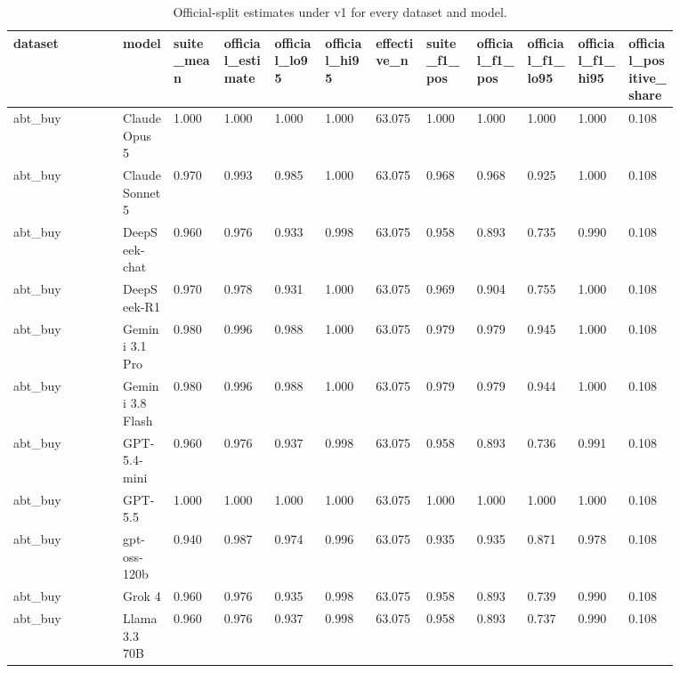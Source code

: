 \begin{landscape}
\tiny
\setlength{\tabcolsep}{3pt}
\begin{longtable}{p{0.134\linewidth}p{0.067\linewidth}p{0.067\linewidth}p{0.067\linewidth}p{0.067\linewidth}p{0.067\linewidth}p{0.067\linewidth}p{0.067\linewidth}p{0.067\linewidth}p{0.067\linewidth}p{0.067\linewidth}p{0.067\linewidth}}
\caption{Official-split estimates under v1 for every dataset and model.}\label{tab:official_split_v1}\\
\toprule
dataset & model & suite\_\allowbreak{}mean & official\_\allowbreak{}estimate & official\_\allowbreak{}lo95 & official\_\allowbreak{}hi95 & effective\_\allowbreak{}n & suite\_\allowbreak{}f1\_\allowbreak{}pos & official\_\allowbreak{}f1\_\allowbreak{}pos & official\_\allowbreak{}f1\_\allowbreak{}lo95 & official\_\allowbreak{}f1\_\allowbreak{}hi95 & official\_\allowbreak{}positive\_\allowbreak{}share \\
\midrule
abt\_\allowbreak{}buy & Claude Opus 5 & 1.000 & 1.000 & 1.000 & 1.000 & 63.075 & 1.000 & 1.000 & 1.000 & 1.000 & 0.108 \\
abt\_\allowbreak{}buy & Claude Sonnet 5 & 0.970 & 0.993 & 0.985 & 1.000 & 63.075 & 0.968 & 0.968 & 0.925 & 1.000 & 0.108 \\
abt\_\allowbreak{}buy & DeepSeek-chat & 0.960 & 0.976 & 0.933 & 0.998 & 63.075 & 0.958 & 0.893 & 0.735 & 0.990 & 0.108 \\
abt\_\allowbreak{}buy & DeepSeek-R1 & 0.970 & 0.978 & 0.931 & 1.000 & 63.075 & 0.969 & 0.904 & 0.755 & 1.000 & 0.108 \\
abt\_\allowbreak{}buy & Gemini 3.1 Pro & 0.980 & 0.996 & 0.988 & 1.000 & 63.075 & 0.979 & 0.979 & 0.945 & 1.000 & 0.108 \\
abt\_\allowbreak{}buy & Gemini 3.8 Flash & 0.980 & 0.996 & 0.988 & 1.000 & 63.075 & 0.979 & 0.979 & 0.944 & 1.000 & 0.108 \\
abt\_\allowbreak{}buy & GPT-5.4-mini & 0.960 & 0.976 & 0.937 & 0.998 & 63.075 & 0.958 & 0.893 & 0.736 & 0.991 & 0.108 \\
abt\_\allowbreak{}buy & GPT-5.5 & 1.000 & 1.000 & 1.000 & 1.000 & 63.075 & 1.000 & 1.000 & 1.000 & 1.000 & 0.108 \\
abt\_\allowbreak{}buy & gpt-oss-120b & 0.940 & 0.987 & 0.974 & 0.996 & 63.075 & 0.935 & 0.935 & 0.871 & 0.978 & 0.108 \\
abt\_\allowbreak{}buy & Grok 4 & 0.960 & 0.976 & 0.935 & 0.998 & 63.075 & 0.958 & 0.893 & 0.739 & 0.990 & 0.108 \\
abt\_\allowbreak{}buy & Llama 3.3 70B & 0.960 & 0.976 & 0.937 & 0.998 & 63.075 & 0.958 & 0.893 & 0.737 & 0.990 & 0.108 \\

\end{longtable}
\end{landscape}
